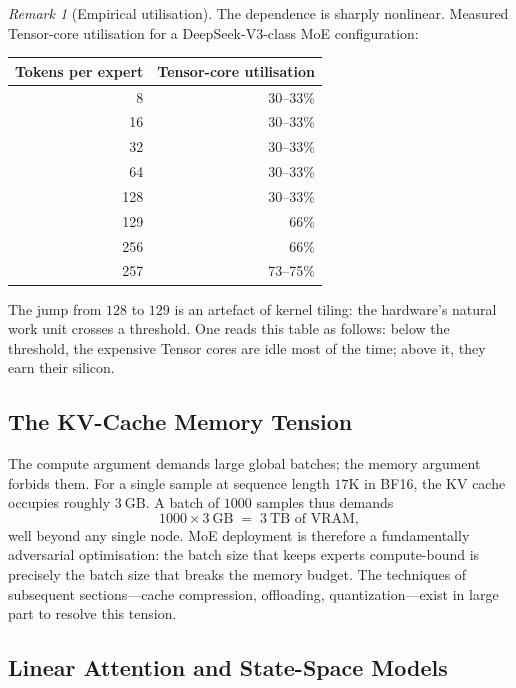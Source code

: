 \documentclass[11pt,a4paper]{article}
\theoremstyle{definition}
\theoremstyle{remark}
\newtheorem*{remark}{Remark}
\theoremstyle{plain}
\begin{document}
\begin{remark}[Empirical utilisation]
The dependence is sharply nonlinear. Measured Tensor-core utilisation for
a DeepSeek-V3-class MoE configuration:
\begin{center}
\renewcommand{\arraystretch}{1.25}
\begin{tabular}{@{}rr@{}}
\toprule
\textbf{Tokens per expert} & \textbf{Tensor-core utilisation} \\
\midrule
8   & 30--33\% \\
16  & 30--33\% \\
32  & 30--33\% \\
64  & 30--33\% \\
128 & 30--33\% \\
129 & 66\% \\
256 & 66\% \\
257 & 73--75\% \\
\bottomrule
\end{tabular}
\end{center}
The jump from $128$ to $129$ is an artefact of kernel tiling: the
hardware's natural work unit crosses a threshold. One reads this table as
follows: below the threshold, the expensive Tensor cores are idle most of
the time; above it, they earn their silicon.
\end{remark}

\subsection{The KV-Cache Memory Tension}

The compute argument demands large global batches; the memory argument
forbids them. For a single sample at sequence length $17\text{K}$ in BF16,
the KV cache occupies roughly $3~\text{GB}$. A batch of $1000$ samples
thus demands
\begin{equation}
  1000 \times 3~\text{GB} \;=\; 3~\text{TB of VRAM},
\end{equation}
well beyond any single node. MoE deployment is therefore a fundamentally
adversarial optimisation: the batch size that keeps experts compute-bound
is precisely the batch size that breaks the memory budget. The techniques
of subsequent sections---cache compression, offloading,
quantization---exist in large part to resolve this tension.

\subsection{Linear Attention and State-Space Models}
\end{document}
